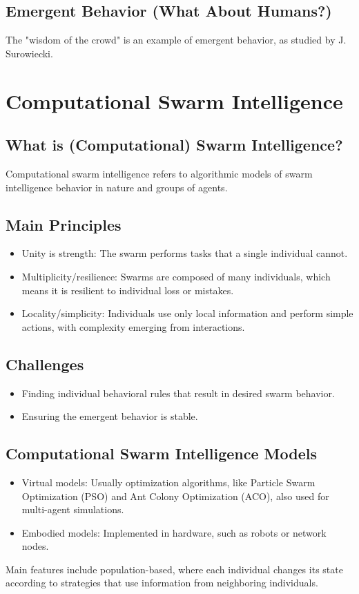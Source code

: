 \subsection*{Emergent Behavior (What About Humans?)}
The "wisdom of the crowd" is an example of emergent behavior, as studied by J. Surowiecki.

\section{Computational Swarm Intelligence}
\subsection*{What is (Computational) Swarm Intelligence?}
Computational swarm intelligence refers to algorithmic models of swarm intelligence behavior in nature and groups of agents.

\subsection*{Main Principles}
\begin{itemize}
    \item Unity is strength: The swarm performs tasks that a single individual cannot.
    \item Multiplicity/resilience: Swarms are composed of many individuals, which means it is resilient to individual loss or mistakes.
    \item Locality/simplicity: Individuals use only local information and perform simple actions, with complexity emerging from interactions.
\end{itemize}

\subsection*{Challenges}
\begin{itemize}
    \item  Finding individual behavioral rules that result in desired swarm behavior.
     \item Ensuring the emergent behavior is stable.
\end{itemize}

\subsection*{Computational Swarm Intelligence Models}
\begin{itemize}
    \item Virtual models: Usually optimization algorithms, like Particle Swarm Optimization (PSO) and Ant Colony Optimization (ACO), also used for multi-agent simulations.
    \item  Embodied models: Implemented in hardware, such as robots or network nodes.
\end{itemize}
Main features include population-based, where each individual changes its state according to strategies that use information from neighboring individuals.

